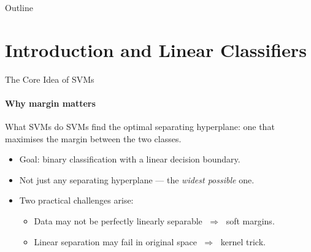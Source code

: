 \begin{frame}
  \titlepage
\end{frame}

\begin{frame}{Outline}
  \tableofcontents
\end{frame}

\section{Introduction and Linear Classifiers}

\begin{frame}{The Core Idea of SVMs}
  \framesubtitle{Why margin matters}
  \begin{block}{What SVMs do}
    SVMs find the \alert{optimal} separating hyperplane: one that maximises
    the \alert{margin} between the two classes.
  \end{block}
  \vspace{0.5em}
  \begin{itemize}
    \item Goal: binary classification with a linear decision boundary.
    \item Not just any separating hyperplane — the \emph{widest possible} one.
    \item Two practical challenges arise:
      \begin{itemize}
        \item Data may not be perfectly linearly separable $\;\Rightarrow\;$
              \alert{soft margins}.
        \item Linear separation may fail in original space $\;\Rightarrow\;$
              \alert{kernel trick}.
      \end{itemize}
  \end{itemize}
\end{frame}

